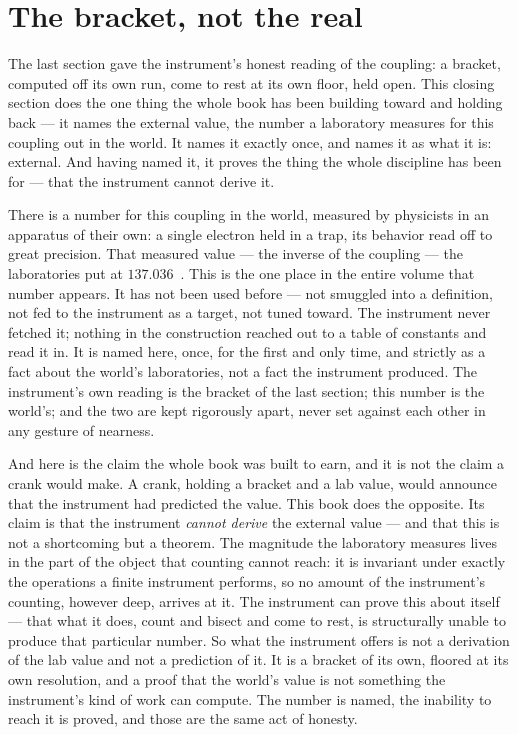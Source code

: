 \section{The bracket, not the real}

The last section gave the instrument's honest reading of the coupling: a bracket, computed off its own run, come to rest at its own
floor, held open. This closing section does the one thing the whole book has been building toward and holding back --- it
names the external value, the number a laboratory measures for this coupling out in the world. It names it exactly once, and
names it as what it is: external. And having named it, it proves the thing the whole discipline has been for --- that the
instrument cannot derive it.

There is a number for this coupling in the world, measured by physicists in an apparatus of their own: a single electron held
in a trap, its behavior read off to great precision. That measured value --- the inverse of the coupling --- the laboratories
put at $137.036$~\cite{hanneke2008}. This is the one place in the entire volume that number appears. It has not been used
before --- not smuggled into a definition, not fed to the instrument as a target, not tuned toward. The instrument never
fetched it; nothing in the construction reached out to a table of constants and read it in. It is named here, once, for the
first and only time, and strictly as a fact about the world's laboratories, not a fact the instrument produced. The
instrument's own reading is the bracket of the last section; this number is the world's; and the two are kept rigorously
apart, never set against each other in any gesture of nearness.

And here is the claim the whole book was built to earn, and it is not the claim a crank would make. A crank, holding a
bracket and a lab value, would announce that the instrument had predicted the value. This book does the opposite. Its claim is
that the instrument \emph{cannot derive} the external value --- and that this is not a shortcoming but a theorem. The
magnitude the laboratory measures lives in the part of the object that counting cannot reach: it is invariant under exactly
the operations a finite instrument performs, so no amount of the instrument's counting, however deep, arrives at it. The
instrument can prove this about itself --- that what it does, count and bisect and come to rest, is structurally unable to produce
that particular number. So what the instrument offers is not a derivation of the lab value and not a prediction of it. It is
a bracket of its own, floored at its own resolution, and a proof that the world's value is not something the instrument's
kind of work can compute. The number is named, the inability to reach it is proved, and those are the same act of honesty.

